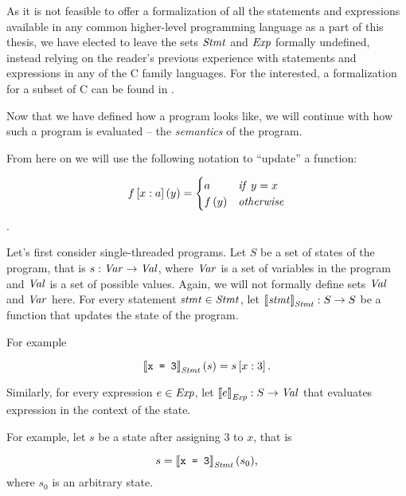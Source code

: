 \documentclass[..thesis.tex]{subfiles}
\begin{document}
As it is not feasible to offer a formalization of all the statements and expressions available in any common higher-level programming language
as a part of this thesis, we have elected to leave the sets $\mathit{Stmt}$ and $\mathit{Exp}$ formally undefined, instead relying on the reader's previous experience
with statements and expressions in any of the C family languages. For the interested, a formalization for a subset of C can be found in \cite[17]{vojdanivesal_static_2010}.


Now that we have defined how a program looks like, we will continue with how such a program is evaluated -- the \textit{semantics} of the program.

From here on we will use the following notation to ``update'' a function:

\begin{equation*}
f \left[ x : a \right] \left( y \right) = 
  \begin{cases}
  a & \mathit{if} ~ y = x \\
  f \left(  y \right) & \mathit{otherwise} \\ 
  \end{cases}
\end{equation*}.

Let's first consider single-threaded programs. Let $S$ be a set of states of the program, that is $s : \mathit{Var} \to \mathit{Val}$, where $\mathit{Var}$ is a set of
variables in the program and $\mathit{Val}$ is a set of possible values. Again, we will not formally define sets $\mathit{Val}$ and $\mathit{Var}$ here.
For every statement $\mathit{stmt} \in \mathit{Stmt}$, let $ \left\llbracket \mathit{stmt} \right\rrbracket_{\mathit{Stmt}} : S \to S$ be a function that updates the state of the program. 

For example

\begin{equation*}
 \left\llbracket \text{\texttt{x = 3}} \right\rrbracket_{\mathit{Stmt}} (s) = s \left[ x : 3 \right] \text{.}
\end{equation*}

Similarly, for every expression $e \in \mathit{Exp}$, let $\left\llbracket e \right\rrbracket_{\mathit{Exp}} : S \to \mathit{Val}$ that evaluates expression in the context of the state. 

For example, let $s$ be a state after assigning $3$ to $x$, that is

\begin{equation*}
s = \left\llbracket \text{\texttt{x = 3}} \right\rrbracket_{\mathit{Stmt}} (s_0) \text{,}
\end{equation*}
where $s_0$ is an arbitrary state. 
\end{document}
